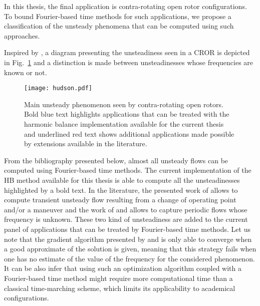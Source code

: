 
In this thesis, the final application is contra-rotating open rotor
configurations. To bound Fourier-based time methods for such
applications, we propose a classification of the
unsteady phenomena that can be computed using such approaches.

Inspired by \citet{Hodson1998},
a diagram presenting the unsteadiness seen in 
a CROR is depicted in Fig.~\ref{fig:hudson} and a distinction
is made between unsteadinesses whose frequencies are
known or not.
\begin{figure}[htp]
  \centering
  \texttt{[image: hudson.pdf]}
  \caption{Main unsteady phenomenon seen by contra-rotating
  open rotors. Bold blue text highlights applications that can
  be treated with the harmonic balance implementation available for the
  current thesis and underlined red text shows additional applications
  made possible by extensions available in the literature.}
  \label{fig:hudson}
\end{figure}
From the bibliography presented below, almost all
unsteady flows can be computed using Fourier-based time methods.
The current implementation of the HB method available for
this thesis is able to compute all the unsteadinesses highlighted
by a bold text. In the literature, the presented work of 
\citet{Mavriplis2012} allows to compute transient unsteady flow
resulting from a change of operating point and/or a maneuver and
the work of \citet{McMullen2002} and \citet{Gopinath2006} allows
to capture periodic flows whose frequency is unknown. These two
kind of unsteadiness are added
to the current panel of applications that can
be treated by Fourier-based time methods. Let us note
that the gradient algorithm presented by \citet{McMullen2002}
and \citet{Gopinath2006} is only able to converge when a 
good approximate of the solution is given, meaning
that this strategy fails when one has no estimate
of the value of the frequency for the considered phenomenon.
It can be also infer that using such an optimization algorithm
coupled with a Fourier-based time method
might require more computational time than a classical time-marching scheme,
which limits its applicability to academical configurations.

